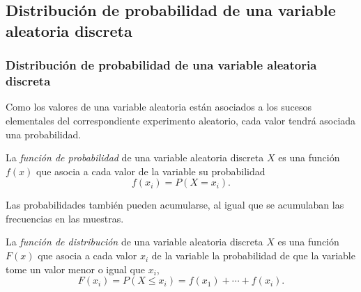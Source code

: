 \subsection{Distribución de probabilidad de una variable aleatoria discreta}

\begin{frame}
\frametitle{Distribución de probabilidad de una variable aleatoria discreta}
Como los valores de una variable aleatoria están asociados a los sucesos elementales del correspondiente experimento aleatorio, cada valor tendrá asociada una probabilidad.
\begin{definicion}
La \emph{función de probabilidad} de una variable aleatoria discreta $X$ es una función $f(x)$ que asocia a cada valor de la variable su probabilidad
\[
f(x_i) = P(X=x_i).
\] 
\end{definicion}

Las probabilidades también pueden acumularse, al igual que se acumulaban las frecuencias en las muestras.

\begin{definicion} 
La \emph{función de distribución} de una variable aleatoria discreta $X$ es una función $F(x)$ que asocia a cada valor $x_i$ de la variable la probabilidad de que la variable tome un valor menor o igual que $x_i$, 
\[
F(x_i) = P(X\leq x_i) = f(x_1)+\cdots +f(x_i).
\]
\end{definicion} 

\end{frame}


